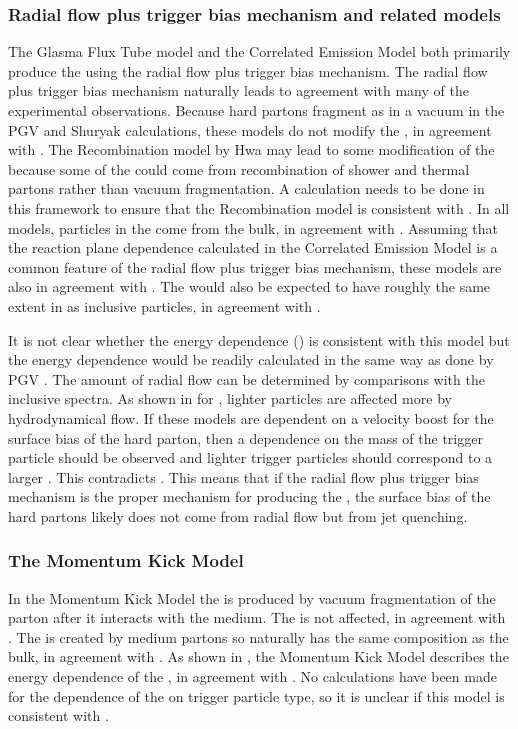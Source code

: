  \subsubsection{Radial flow plus trigger bias mechanism and related models}
The Glasma Flux Tube model and the Correlated Emission Model both primarily produce the \ridge using the radial flow plus trigger bias mechanism.  The radial flow plus trigger bias mechanism naturally leads to agreement with many of the experimental observations.  Because hard partons fragment as in a vacuum in the PGV and Shuryak calculations, these models do not modify the \jlc, in agreement with .  The Recombination model by Hwa may lead to some modification of the \jlc because some of the \jlc could come from recombination of shower and thermal partons rather than vacuum fragmentation.  A calculation needs to be done in this framework to ensure that the Recombination model is consistent with .  In all models, particles in the \ridge come from the bulk, in agreement with .  Assuming that the reaction plane dependence calculated in the Correlated Emission Model \cite{Chiu:2008ht} is a common feature of the radial flow plus trigger bias mechanism, these models are also in agreement with .  The \ridge would also be expected to have roughly the same extent in \deta as inclusive particles, in agreement with .

It is not clear whether the energy dependence () is consistent with this model but the energy dependence would be readily calculated in the same way as done by PGV \cite{Pruneau:2007ua}.  The amount of radial flow can be determined by comparisons with the inclusive spectra.  As shown in  for \vtwo, lighter particles are affected more by hydrodynamical flow.  If these models are dependent on a velocity boost for the surface bias of the hard parton, then a dependence on the mass of the trigger particle should be observed and lighter trigger particles should correspond to a larger \ridge.  This contradicts .  This means that if the radial flow plus trigger bias mechanism is the proper mechanism for producing the \ridge, the surface bias of the hard partons likely does not come from radial flow but from jet quenching.

 \subsubsection{The Momentum Kick Model}
In the Momentum Kick Model the \jlc is produced by vacuum fragmentation of the parton after it interacts with the medium.  The \jlc is not affected, in agreement with .  The \ridge is created by medium partons so naturally has the same composition as the bulk, in agreement with .  As shown in , the Momentum Kick Model describes the energy dependence of the \ridge, in agreement with .  No calculations have been made for the dependence of the \ridge on trigger particle type, so it is unclear if this model is consistent with .


